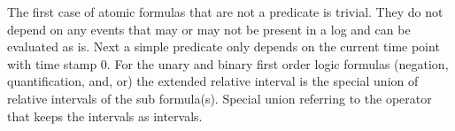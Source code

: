 The first case of atomic formulas that are not a predicate is trivial.
They do not depend on any events that may or may not be present in a log and can be evaluated as is.
Next a simple predicate only depends on the current time point with time stamp $0$.
For the unary and binary first order logic formulas (negation, quantification, and, or) the extended relative interval is the special union of relative intervals of the sub formula(s).
Special union referring to the operator that keeps the intervals as intervals.
